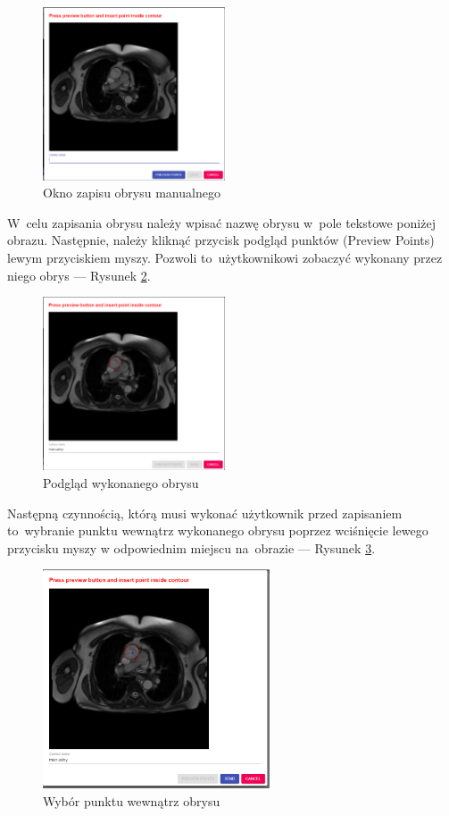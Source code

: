 \documentclass[a4paper,11pt,twoside,openright]{report}
\theoremstyle{definition}
\begin{document}
\begin{figure}[h!]
	\center
	\includegraphics[width=0.48\textwidth]{6}
	\caption{Okno zapisu obrysu manualnego}
    	\label{fig:6}
\end{figure}

W~celu zapisania obrysu należy wpisać nazwę obrysu w~pole tekstowe poniżej obrazu.
Następnie, należy kliknąć przycisk podgląd punktów (Preview Points)
lewym przyciskiem myszy. Pozwoli to~użytkownikowi zobaczyć wykonany przez niego
obrys --- Rysunek \ref{fig:7}.

\begin{figure}[h!]
	\center
	\includegraphics[width=0.48\textwidth]{7}
	\caption{Podgląd wykonanego obrysu}
    	\label{fig:7}
\end{figure}

Następną czynnością, którą musi wykonać użytkownik przed zapisaniem to~wybranie
punktu wewnątrz wykonanego obrysu poprzez wciśnięcie lewego przycisku myszy w
odpowiednim miejscu na~obrazie --- Rysunek \ref{fig:8}.

\pagebreak

\begin{figure}[h!]
	\center
	\includegraphics[width=0.6\textwidth]{8}
	\caption{Wybór punktu wewnątrz obrysu}
    	\label{fig:8}
\end{figure}
\end{document}
